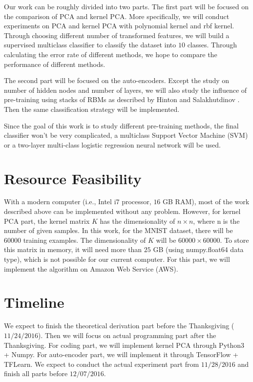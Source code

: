 \documentclass{article}
\begin{document}
Our work can be roughly divided into two parts. The first part will be focused on the comparison of PCA and kernel PCA. More specifically, we will conduct experiments on PCA and kernel PCA with polynomial kernel and rbf kernel. Through choosing different number of transformed features, we will build a supervised multiclass classifier to classify the dataset into $10$ classes. Through calculating the error rate of different methods, we hope to compare the performance of different methods.

The second part will be focused on the auto-encoders. Except the study on number of hidden nodes and number of layers, we will also study the influence of pre-training using stacks of RBMs as described by Hinton and Salakhutdinov \cite{hinton2006reducing}. Then the same classification strategy will be implemented.

Since the goal of this work is to study different pre-training methods, the final classifier won't be very complicated, a multiclass Support Vector Machine (SVM) or a two-layer multi-class logistic regression neural network will be used.

\section{Resource Feasibility}
\label{sec:feasibility}

With a modern computer (i.e., Intel i$7$ processor, $16$ GB RAM), most of the work described above can be implemented without any problem. However, for kernel PCA part, the kernel matrix $K$ has the dimensionality of $n \times n$, where n is the number of given samples. In this work, for the MNIST dataset, there will be $60000$ training examples. The dimensionality of $K$ will be $60000 \times 60000$. To store this matrix in memory, it will need more than $25$ GB (using numpy.float64 data type), which is not possible for our current computer. For this part, we will implement the algorithm on Amazon Web Service (AWS).

\section{Timeline}
\label{sec:timeline}

We expect to finish the theoretical derivation part before the Thanksgiving ($11/24/2016$). Then we will focus on actual programming part after the Thanksgiving. For coding part, we will implement kernel PCA through Python3 + Numpy. For auto-encoder part, we will implement it through TensorFlow + TFLearn. We expect to conduct the actual experiment part from $11/28/2016$ and finish all parts before $12/07/2016$.

\vfill\pagebreak


%

\end{document}
